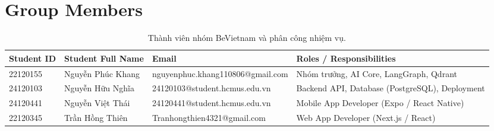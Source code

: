 \section{Group Members}


\begin{table}[H]
\centering
\begin{tabularx}{\textwidth}{l p{3.5cm} l X}
\toprule
\textbf{Student ID} & \textbf{Student Full Name} & \textbf{Email} & \textbf{Roles / Responsibilities} \\
\midrule
22120155 & Nguyễn Phúc Khang & nguyenphuc.khang110806@gmail.com & Nhóm trưởng, AI Core, LangGraph, Qdrant \\
24120103 & Nguyễn Hữu Nghĩa & 24120103@student.hcmus.edu.vn & Backend API, Database (PostgreSQL), Deployment \\
24120441 & Nguyễn Việt Thái & 24120441@student.hcmus.edu.vn & Mobile App Developer (Expo / React Native) \\
22120345 & Trần Hồng Thiên & Tranhongthien4321@gmail.com & Web App Developer (Next.js / React) \\
\bottomrule
\end{tabularx}
\caption{Thành viên nhóm BeVietnam và phân công nhiệm vụ.}
\label{tab:group_members}
\end{table}
